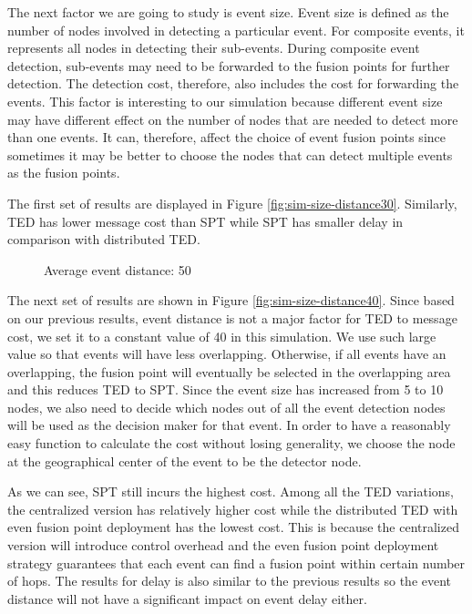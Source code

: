 The next factor we are going to study is event size. Event size is defined as the number of nodes involved in detecting a particular event. For composite events, it represents all nodes in detecting their sub-events. During composite event detection, sub-events may need to be forwarded to the fusion points for further detection. The detection cost, therefore, also includes the cost for forwarding the events. This factor is interesting to our simulation because different event size may have different effect on the number of nodes that are needed to detect more than one events. It can, therefore, affect the choice of event fusion points since sometimes it may be better to choose the nodes that can detect multiple events as the fusion points.

The first set of results are displayed in Figure \ref{fig:sim-size-distance30}. Similarly, TED has lower message cost than SPT while SPT has smaller delay in comparison with distributed TED.

\begin{figure}
\centering
{}
\caption{Average event distance: 50}
\label{fig:sim-size-distance50}
\end{figure}

The next set of results are shown in Figure \ref{fig:sim-size-distance40}. Since based on our previous results, event distance is not a major factor for TED to message cost, we set it to a constant value of 40 in this simulation. We use such large value so that events will have less overlapping. Otherwise, if all events have an overlapping, the fusion point will eventually be selected in the overlapping area and this reduces TED to SPT. Since the event size has increased from 5 to 10 nodes, we also need to decide which nodes out of all the event detection nodes will be used as the decision maker for that event. In order to have a reasonably easy function to calculate the cost without losing generality, we choose the node at the geographical center of the event to be the detector node.

As we can see, SPT still incurs the highest cost. Among all the TED variations, the centralized version has relatively higher cost while the distributed TED with even fusion point deployment has the lowest cost. This is because the centralized version will introduce control overhead and the even fusion point deployment strategy guarantees that each event can find a fusion point within certain number of hops. The results for delay is also similar to the previous results so the event distance will not have a significant impact on event delay either.

